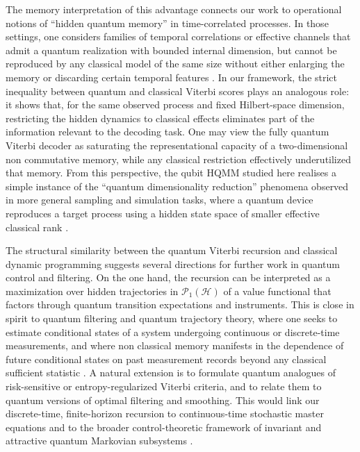 \documentclass[12pt, reco]{article}
\begin{document}
The memory interpretation of this advantage connects our work to operational notions of “hidden quantum memory”  in time-correlated processes. In those settings, one considers families of temporal correlations or effective channels that admit a quantum realization with bounded internal dimension, but cannot be reproduced by any classical model of the same size without either enlarging the memory or discarding certain temporal features \cite{TaElM,TaBra25}. In our framework, the strict inequality between quantum and classical Viterbi scores plays an analogous role: it shows that, for the same observed process and fixed Hilbert-space dimension, restricting the hidden dynamics to classical effects eliminates part of the information relevant to the decoding task. One may view the fully quantum Viterbi decoder as saturating the representational capacity of a two-dimensional non commutative memory, while any classical restriction effectively underutilized that memory. From this perspective, the qubit HQMM studied here realises a simple instance of the “quantum dimensionality reduction” phenomena observed in more general sampling and simulation tasks, where a quantum device reproduces a target process using a hidden state space of smaller effective classical rank \cite{YangElliot25}.

The structural similarity between the quantum Viterbi recursion and classical dynamic programming suggests several directions for further work in quantum control and filtering. On the one hand, the recursion can be interpreted as a maximization over hidden trajectories in \(\mathcal{P}_1(\mathcal{H})\) of a value functional that factors through quantum transition expectations and instruments. This is close in spirit to quantum filtering and quantum trajectory theory, where one seeks to estimate conditional states of a system undergoing continuous or discrete-time measurements, and where non classical memory manifests in the dependence of future conditional states on past measurement records beyond any classical sufficient statistic \cite{ticozzi2008,HY2018}. A natural extension is to formulate quantum analogues of risk-sensitive or entropy-regularized Viterbi criteria, and to relate them to quantum versions of optimal filtering and smoothing. This would link our discrete-time, finite-horizon recursion to continuous-time stochastic master equations and to the broader control-theoretic framework of invariant and attractive quantum Markovian subsystems \cite{ticozzi2008}.
\end{document}
